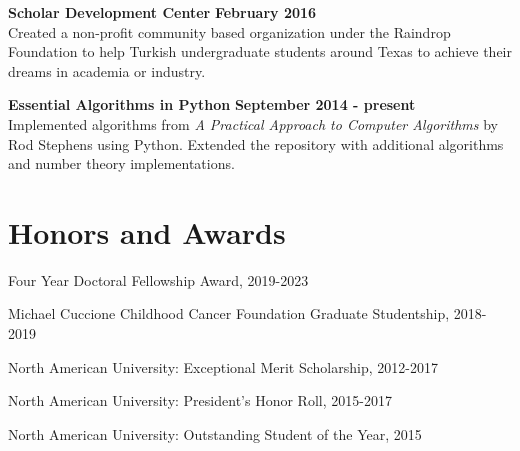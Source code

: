 \documentclass[margin,line]{res}
\begin{document}
\begin{resume}
{\bf Scholar Development Center} \hfill {\bf February  2016}\\
Created a non-profit community based organization under the Raindrop Foundation to help Turkish undergraduate students around Texas to achieve their dreams in academia or industry.

{\bf Essential Algorithms in Python} \hfill {\bf September 2014 - present}\\
Implemented algorithms from {\em A Practical Approach to Computer Algorithms} by Rod Stephens using Python. Extended the repository with additional algorithms and number theory implementations. %

\vspace{\baselineskip}


\section{\sc Honors and Awards}

Four Year Doctoral Fellowship Award, 2019-2023

\vspace*{-2.5mm}

Michael Cuccione Childhood Cancer Foundation Graduate Studentship, 2018-2019

\vspace*{-2.5mm}
North American University: Exceptional Merit Scholarship, 2012-2017

\vspace*{-2.5mm}
North American University: President's Honor Roll, 2015-2017

\vspace*{-2.5mm}
North American University: Outstanding Student of the Year, 2015





\end{resume}
\end{document}
